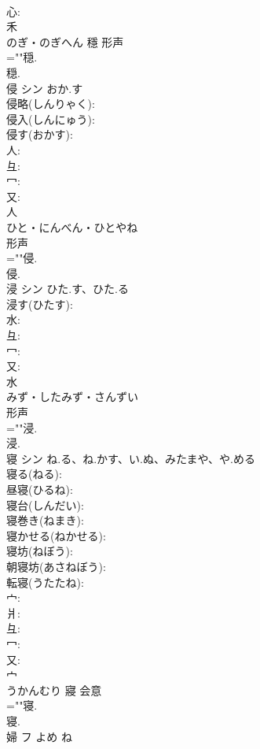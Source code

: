 \documentclass[8pt]{extreport}
\begin{document}
\begin{CJK}{UTF8}{min}
\\	心: 
\\	禾	
\\	のぎ・のぎへん	穩	形声 
\\	=""穏.
\\	穏.
\\	侵	シン	おか.す		
\\	侵略(しんりゃく): 
\\	侵入(しんにゅう): 
\\	侵す(おかす): 
\\	人: 
\\	彑: 
\\	冖: 
\\	又: 
\\	人	
\\	ひと・にんべん・ひとやね	
\\	形声 
\\	=""侵.
\\	侵.
\\	浸	シン	ひた.す、ひた.る		
\\	浸す(ひたす): 
\\	水: 
\\	彑: 
\\	冖: 
\\	又: 
\\	水	
\\	みず・したみず・さんずい	
\\	形声 
\\	=""浸.
\\	浸.
\\	寝	シン	ね.る、ね.かす、い.ぬ、みたまや、や.める		
\\	寝る(ねる): 
\\	昼寝(ひるね): 
\\	寝台(しんだい): 
\\	寝巻き(ねまき): 
\\	寝かせる(ねかせる): 
\\	寝坊(ねぼう): 
\\	朝寝坊(あさねぼう): 
\\	転寝(うたたね): 
\\	宀: 
\\	爿: 
\\	彑: 
\\	冖: 
\\	又: 
\\	宀	
\\	うかんむり	寢	会意 
\\	=""寝.
\\	寝.
\\	婦	フ	よめ	ね	

\end{CJK}
\end{document}
